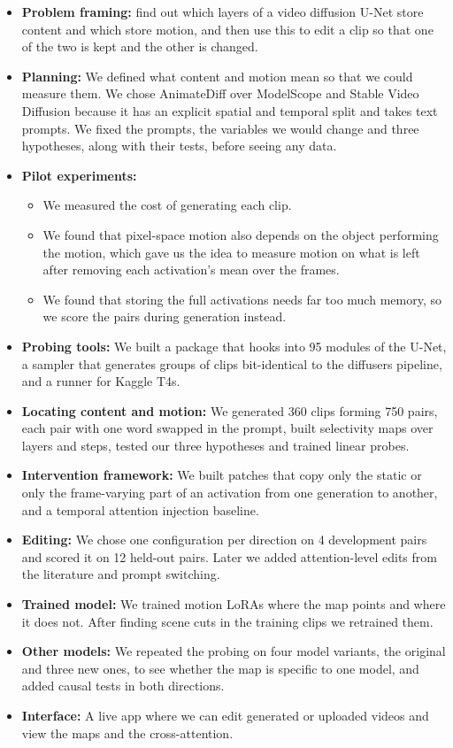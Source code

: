 \documentclass[twoside,english]{article}
\begin{document}
\begin{itemize}
\item \textbf{Problem framing:} find out which layers of a video diffusion U-Net store content and
  which store motion, and then use this to edit a clip so that one of the two is kept and the other
  is changed.
\item \textbf{Planning:} We defined what content and motion mean so that we could measure them. We
  chose AnimateDiff over ModelScope and Stable Video Diffusion because it has an explicit spatial and
  temporal split and takes text prompts. We fixed the prompts, the variables we would change and three
  hypotheses, along with their tests, before seeing any data.
\item \textbf{Pilot experiments:}
 \begin{itemize}
  \item We measured the cost of generating each clip.
  \item We found that pixel-space motion also depends on the object performing the motion, which
  gave us the idea to measure motion on what is left after removing each activation's mean over the
  frames.
  \item We found that storing the full activations needs far too much memory, so we score the pairs
  during generation instead.
  \end{itemize}
\item \textbf{Probing tools:} We built a package that hooks into 95 modules of the U-Net, a sampler
  that generates groups of clips bit-identical to the diffusers pipeline, and a runner for Kaggle T4s.
\item \textbf{Locating content and motion:} We generated 360 clips forming 750 pairs, each pair with
  one word swapped in the prompt, built selectivity maps over layers and steps, tested our three
  hypotheses and trained linear probes.
\item \textbf{Intervention framework:} We built patches that copy only the static or only the
  frame-varying part of an activation from one generation to another, and a temporal attention
  injection baseline.
\item \textbf{Editing:} We chose one configuration per direction on 4 development pairs and scored it
  on 12 held-out pairs. Later we added attention-level edits from the literature and prompt switching.
\item \textbf{Trained model:} We trained motion LoRAs where the map points and where it does not.
  After finding scene cuts in the training clips we retrained them.
\item \textbf{Other models:} We repeated the probing on four model variants, the original and three
  new ones, to see whether the map is specific to one model, and added causal tests in both directions.
\item \textbf{Interface:} A live app where we can edit generated or uploaded videos and view the maps
  and the cross-attention.
\end{itemize}
\end{document}
